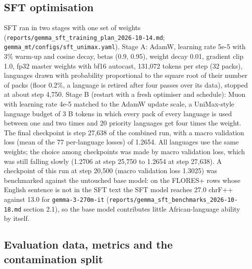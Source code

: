 \subsection{SFT optimisation}\label{sft-optimisation}

SFT ran in two stages with one set of weights (\texttt{reports/gemma\_sft\_training\_plan\_2026-10-14.md}; \texttt{gemma\_mt/configs/sft\_unimax.yaml}). Stage A: AdamW, learning rate 5e-5 with 3\% warm-up and cosine decay, betas (0.9, 0.95), weight decay 0.01, gradient clip 1.0, fp32 master weights with bf16 autocast, 131,072 tokens per step (32 packs), languages drawn with probability proportional to the square root of their number of packs (floor 0.2\%, a language is retired after four passes over its data), stopped at about step 4,750. Stage B (restart with a fresh optimiser and schedule): Muon with learning rate 4e-5 matched to the AdamW update scale, a UniMax-style language budget of 3 B tokens in which every pack of every language is used between one and two times and 20 priority languages get four times the weight. The final checkpoint is step 27,638 of the combined run, with a macro validation loss (mean of the 77 per-language losses) of 1.2654. All languages use the same weights; the choice among checkpoints was made by macro validation loss, which was still falling slowly (1.2706 at step 25,750 to 1.2654 at step 27,638). A checkpoint of this run at step 20,500 (macro validation loss 1.3025) was benchmarked against the untouched base model: on the FLORES+ rows whose English sentence is not in the SFT text the SFT model reaches 27.0 chrF++ against 13.0 for \texttt{gemma-3-270m-it} (\texttt{reports/gemma\_sft\_benchmarks\_2026-10-18.md} section 2.1), so the base model contributes little African-language ability by itself.

\subsection{Evaluation data, metrics and the contamination split}\label{evaluation-data-metrics-and-the-contamination-split}

